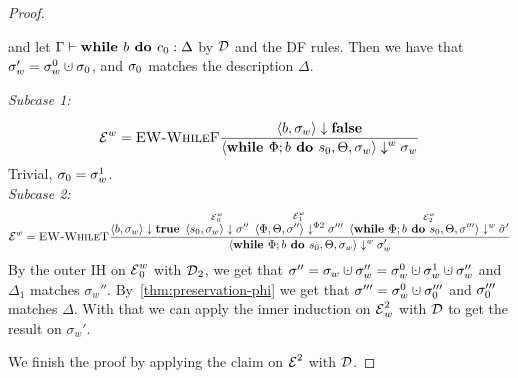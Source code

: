 \begin{proof}
\begin{claim}
        and let $\Gamma \vdash {\textbf{while }{b} \textbf{ do } {c_0}}: \Delta$ by $\operatorname{\mathcal{D}}$ and the DF rules.
        Then we have that $\store_w' = \store_w^0 \dunion \store_0$,
        and $\sigma_0$ matches the description $\Delta$.
    \end{claim}
    \begin{claimproof}
        \emph{Subcase 1:}
        \begin{align*}
            \operatorname{\mathcal{E}}^w = \textsc{EW-WhileF}\frac{\displaystyle 
            \overset{}{\langle b, \sigma_w \rangle \downarrow \textbf{false}}}{\displaystyle \langle \textbf{while }\Phi;{b} \textbf{ do } {s_0}, \Theta, \sigma_w \rangle \downarrow^w \sigma_w}
        \end{align*}
        Trivial, $\sigma_0 = \sigma_w^1$.\\
        \emph{Subcase 2:}
        \begin{align*}
            \operatorname{\mathcal{E}}^w = \textsc{EW-WhileT}\frac{\displaystyle \overset{}{\langle b, \sigma_w \rangle \downarrow \textbf{true}} \enskip
            \overset{\operatorname{\mathcal{E}}^w_0}{\langle s_0, \sigma_w \rangle \downarrow \sigma''} \enskip
            \overset{\operatorname{\mathcal{E}}^w_1}{\langle \Phi, \Theta, \sigma'' \rangle \downarrow^{\Phi2} \sigma'''} \enskip
            \overset{\operatorname{\mathcal{E}}^w_2}{\langle \textbf{while }\Phi;{b} \textbf{ do } {s_0}, \Theta, \sigma''' \rangle \downarrow^w \hat{\sigma}'}}{\displaystyle \langle \textbf{while }\Phi;{b} \textbf{ do } {s_0}, \Theta, \sigma_w \rangle \downarrow^w \sigma_w'}
        \end{align*}
        By the outer IH on $\operatorname{\mathcal{E}}^w_0$ with $\operatorname{\mathcal{D}}_2$, we get that
        $\sigma'' = \sigma_w \dunion \sigma_w'' = \sigma_w^0 \dunion \sigma_w^1 \dunion \sigma_w''$
        and $\Delta_1$ matches $\sigma_w''$.
        By~\autoref{thm:preservation-phi} we get that $\store''' = \store_w^0 \dunion \store_0'''$ and
        $\sigma_0'''$ matches $\Delta$.
        With that we can apply the inner induction on $\operatorname{\mathcal{E}}^2_w$ with $\operatorname{\mathcal{D}}$ to get the result on $\sigma_w'$.
    \end{claimproof}
    We finish the proof by applying the claim on $\operatorname{\mathcal{E}}^2$ with $\operatorname{\mathcal{D}}$.
\end{proof}



